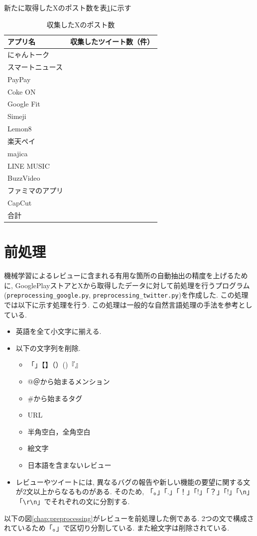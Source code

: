 新たに取得したXのポスト数を表\ref{tb:rawtweetnum2023}に示す

\begin{table}[htbp]
  \caption{収集したXのポスト数}
  \label{tb:rawtweetnum2023}
  \begin{center}
  \begin{tabular}{l|l}
    \hline
    アプリ名&収集したツイート数（件）\\\hline\hline
    にゃんトーク&\\\hline
    スマートニュース&\\\hline
    PayPay&\\\hline
    Coke ON&\\\hline
    Google Fit&\\\hline
    Simeji&\\\hline
    Lemon8&\\\hline
    楽天ペイ&\\\hline
    majica&\\\hline
    LINE MUSIC&\\\hline
    BuzzVideo&\\\hline
    ファミマのアプリ&\\\hline
    CapCut&\\\hline\hline
    合計&
  \end{tabular}\end{center}
\end{table}


\section{前処理}
機械学習によるレビューに含まれる有用な箇所の自動抽出の精度を上げるために, GooglePlayストアとXから取得したデータに対して前処理を行うプログラム(\verb|preprocessing_google.py|, \verb|preprocessing_twitter.py|)を作成した. この処理では以下に示す処理を行う. この処理は一般的な自然言語処理の手法を参考としている. 
\begin{itemize}
  \item 英語を全て小文字に揃える. 
  \item 以下の文字列を削除. 
    \begin{itemize}
      \item 「」【】（）()『』
      \item @＠から始まるメンション
      \item \#から始まるタグ
      \item URL
      \item 半角空白，全角空白
      \item 絵文字
      \item 日本語を含まないレビュー
    \end{itemize}
  \item レビューやツイートには, 異なるバグの報告や新しい機能の要望に関する文が2文以上からなるものがある. そのため, 「。」「.」「！」「!」「？」「!」「\verb|\n|」「\verb|\r\n|」でそれぞれの文に分割する. 
\end{itemize}
以下の図\ref{chap:preprocessing}がレビューを前処理した例である. 2つの文で構成されているため「。」で区切り分割している. また絵文字は削除されている. 

